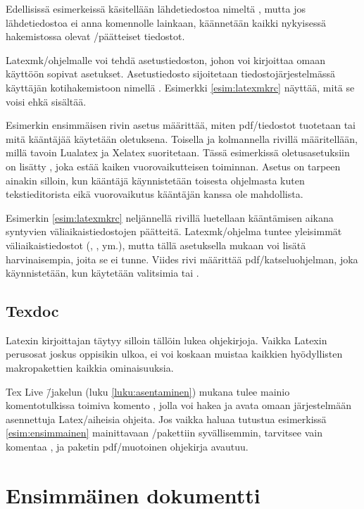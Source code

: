 Edellisissä esimerkeissä käsitellään lähdetiedostoa nimeltä
, mutta jos lähdetiedostoa ei anna komennolle
lainkaan, käännetään kaikki nykyisessä hakemistossa olevat
\-/päätteiset tiedostot.

Latexmk\-/ohjelmalle voi tehdä asetustiedoston, johon voi kirjoittaa
omaan käyttöön sopivat asetukset. Asetustiedosto sijoitetaan
tiedostojärjestelmässä käyttäjän kotihakemistoon nimellä
. Esimerkki \ref{esim:latexmkrc} näyttää, mitä se
voisi ehkä sisältää.

Esimerkin ensimmäisen rivin asetus määrittää, miten pdf\-/tiedostot
tuotetaan tai mitä kääntäjää käytetään oletuksena. Toisella ja
kolmannella rivillä määritellään, millä tavoin Lualatex ja Xelatex
suoritetaan. Tässä esimerkissä ole\-tus\-ase\-tuk\-siin on lisätty
, joka estää kaiken vuorovaikutteisen toiminnan.
Asetus on tarpeen ainakin silloin, kun kääntäjä käynnistetään toisesta
ohjelmasta kuten tekstieditorista eikä vuorovaikutus kääntäjän kanssa
ole mahdollista.



Esimerkin \ref{esim:latexmkrc} neljännellä rivillä luetellaan
kääntämisen aikana syntyvien väliaikaistiedostojen päätteitä.
Latexmk\-/ohjelma tuntee yleisimmät väliaikaistiedostot (,
,  ym.), mutta tällä asetuksella mukaan voi lisätä
harvinaisempia, joita se ei tunne. Viides rivi määrittää
pdf\-/katseluohjelman, joka käynnistetään, kun käytetään valitsimia
 tai .

\subsection{Texdoc}

Latexin kirjoittajan täytyy silloin tällöin lukea ohjekirjoja. Vaikka
Latexin perusosat joskus oppisikin ulkoa, ei voi koskaan muistaa
kaikkien hyödyllisten makropakettien kaikkia ominaisuuksia.

Tex Live \=/jakelun (luku \ref{luku:asentaminen}) mukana tulee mainio
komentotulkissa toimiva komento , jolla voi hakea ja avata
omaan järjestelmään asennettuja Latex\-/aiheisia ohjeita. Jos vaikka
haluaa tutustua esimerkissä \ref{esim:ensimmainen} mainittavaan
\-/pakettiin syvällisemmin, tarvitsee vain komentaa
, ja paketin pdf\-/muotoinen ohjekirja avautuu.

\section{Ensimmäinen dokumentti}

